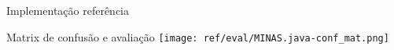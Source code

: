\documentclass[aspectratio=43,10pt]{beamer}
\begin{document}
\begin{frame}[fragile]{Implementação referência}
  \begin{alertblock}{Matrix de confusão e avaliação}
    \texttt{[image: ref/eval/MINAS.java-conf\_mat.png]}
  \end{alertblock}
\end{frame}
\end{document}
